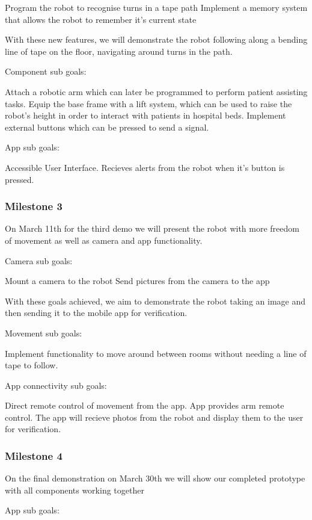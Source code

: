 \documentclass{article}
\begin{document}
Program the robot to recognise turns in a tape path
Implement a memory system that allows the robot to remember it's current state 

With these new features, we will demonstrate the robot following along a bending line of tape on the floor, navigating around turns in the path.

Component sub goals:

Attach a robotic arm which can later be programmed to perform patient assisting tasks.
Equip the base frame with a lift system, which can be used to raise the robot's height in order to interact with patients in hospital beds.
Implement external buttons which can be pressed to send a signal.


App sub goals:

Accessible User Interface.
Recieves alerts from the robot when it's button is pressed.

\subsubsection{Milestone 3}

On March 11th for the third demo we will present the robot with more freedom of movement as well as camera and app functionality.

Camera sub goals:

Mount a camera to the robot
Send pictures from the camera to the app

With these goals achieved, we aim to demonstrate the robot taking an image and then sending it to the mobile app for verification.

Movement sub goals:

Implement functionality to move around between rooms without needing a line of tape to follow.

App connectivity sub goals:

Direct remote control of movement from the app.
App provides arm remote control.
The app will recieve photos from the robot and display them to the user for verification.


\subsubsection{Milestone 4}

On the final demonstration on March 30th we will show our completed prototype with all components working together

App sub goals:
\end{document}
